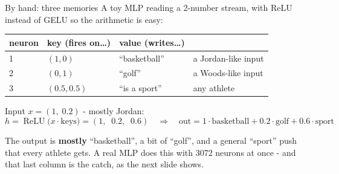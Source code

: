 \documentclass[aspectratio=169]{beamer}
\newcommand{\keybox}[1]{%
  \begin{tcolorbox}[colback=armblue!8, colframe=armblue, boxrule=0.6pt, arc=2pt]
  #1
  \end{tcolorbox}}
\begin{document}
\begin{frame}{By hand: three memories}
  \vspace{0.2em}
  A toy MLP reading a 2-number stream, with ReLU instead of GELU so the arithmetic is easy:

  \vspace{0.4em}
  \begin{center}
  \small
  \begin{tabular}{@{}llll@{}}
    \toprule
    neuron & key (fires on\ldots) & value (writes\ldots) & \\
    \midrule
    1 & $(1, 0)$ & ``basketball'' & a Jordan-like input\\
    2 & $(0, 1)$ & ``golf'' & a Woods-like input\\
    3 & $(0.5, 0.5)$ & ``is a sport'' & any athlete\\
    \bottomrule
  \end{tabular}
  \end{center}

  \vspace{0.3em}
  Input $x = (1,\; 0.2)$ - mostly Jordan:
  \[
    h = \operatorname{ReLU}\big(x \cdot \text{keys}\big) = (1,\;\; 0.2,\;\; 0.6)
    \quad\Rightarrow\quad
    \text{out} = 1\cdot\text{basketball} + 0.2\cdot\text{golf} + 0.6\cdot\text{sport}
  \]

  \vspace{0.3em}
  \keybox{\small The output is \textbf{mostly} ``basketball'', a bit of ``golf'', and a general
  ``sport'' push that every athlete gets. A real MLP does this with 3072 neurons at once - and
  that last column is the catch, as the next slide shows.}
\end{frame}
\end{document}
